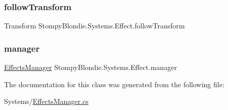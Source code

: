 \subsubsection{\texorpdfstring{follow\+Transform}{followTransform}}
{\footnotesize\ttfamily Transform Stompy\+Blondie.\+Systems.\+Effect.\+follow\+Transform}

\mbox{\label{class_stompy_blondie_1_1_systems_1_1_effect_a06ce39c8c8192912d9e94a3d337afd4e}} 
\subsubsection{\texorpdfstring{manager}{manager}}
{\footnotesize\ttfamily \mbox{\hyperlink{class_stompy_blondie_1_1_systems_1_1_effects_manager}{Effects\+Manager}} Stompy\+Blondie.\+Systems.\+Effect.\+manager}



The documentation for this class was generated from the following file\+:\begin{DoxyCompactItemize}
\item 
Systems/\mbox{\hyperlink{_effects_manager_8cs}{Effects\+Manager.\+cs}}\end{DoxyCompactItemize}
